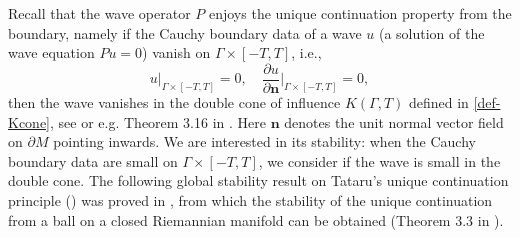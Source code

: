 \documentclass[11pt,letterpaper]{amsart}
\numberwithin{equation}{section}
\theoremstyle{definition}
\theoremstyle{plain}
\theoremstyle{definition}
\theoremstyle{plain}
\theoremstyle{definition}
\theoremstyle{plain}
\begin{document}
\smallskip
Recall that the wave operator $P$ enjoys the unique continuation property from the boundary, namely if the Cauchy boundary data of a wave $u$ (a solution of the wave equation $Pu=0$) vanish on $\Gamma\times [-T,T]$, i.e.,
$$u|_{\Gamma\times [-T,T]}=0,\quad \frac{\partial u}{\partial \textbf{n}} \big|_{\Gamma \times [-T,T]}=0,$$
then the wave vanishes in the double cone of influence $K(\Gamma,T)$ defined in \eqref{def-Kcone}, see \cite{T} or e.g. Theorem 3.16 in \cite{KKL}. Here $\textbf{n}$ denotes the unit normal vector field on $\partial M$ pointing inwards. We are interested in its stability: when the Cauchy boundary data are small on $\Gamma\times [-T,T]$, we consider if the wave is small in the double cone. The following global stability result on Tataru's unique continuation principle (\cite{T}) was proved in \cite{BKL2}, from which the stability of the unique continuation from a ball on a closed Riemannian manifold can be obtained (Theorem 3.3 in \cite{BKL2}).
\end{document}
